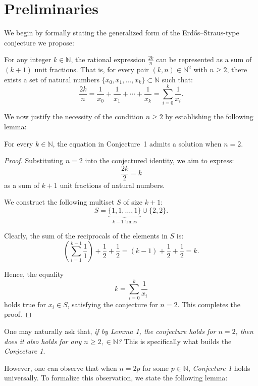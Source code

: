 \section{Preliminaries}

We begin by formally stating the generalized form of the Erdős–Straus-type conjecture we propose:

\begin{conjecture}
For any integer $k \in \mathbb{N}$, the rational expression $\frac{2k}{n}$ can be represented as a sum of $(k+1)$ unit fractions. That is, for every pair $(k, n) \in \mathbb{N}^2$ with $n \geq 2$, there exists a set of natural numbers $\{ x_0, x_1, \dots, x_k \} \subset \mathbb{N}$ such that:
\[
\frac{2k}{n} = \frac{1}{x_0} + \frac{1}{x_1} + \cdots + \frac{1}{x_k} = \sum_{i=0}^{k} \frac{1}{x_i}.
\]
\end{conjecture}

We now justify the necessity of the condition $n \geq 2$ by establishing the following lemma:

\begin{lemma}
For every $k \in \mathbb{N}$, the equation in Conjecture~1 admits a solution when $n = 2$.
\end{lemma}

\begin{proof}
Substituting $n = 2$ into the conjectured identity, we aim to express:
\[
\frac{2k}{2} = k
\]
as a sum of $k+1$ unit fractions of natural numbers.

We construct the following multiset $S$ of size $k+1$:
\[
S = \underbrace{\{ 1, 1, \dots, 1 \}}_{k-1\text{ times}} \cup \{ 2, 2 \}.
\]

Clearly, the sum of the reciprocals of the elements in $S$ is:
\[
\left( \sum_{i=1}^{k-1} \frac{1}{1} \right) + \frac{1}{2} + \frac{1}{2} = (k-1) + \frac{1}{2} + \frac{1}{2} = k.
\]

Hence, the equality
\[
k = \sum_{i=0}^{k} \frac{1}{x_i}
\]
holds true for $x_i \in S$, satisfying the conjecture for $n = 2$. This completes the proof.
\end{proof}

One may naturally ask that, \emph{if by Lemma 1, the conjecture holds for $n=2$, then does it also holds for any $n \geq 2, \in \mathbb{N}$?}
This is specifically what builds the \emph{Conjecture 1}.

However, one can observe that when $n = 2p$ for some $p \in \mathbb{N}$, \emph{Conjecture 1} holds universally. To formalize this observation, we state the following lemma:

